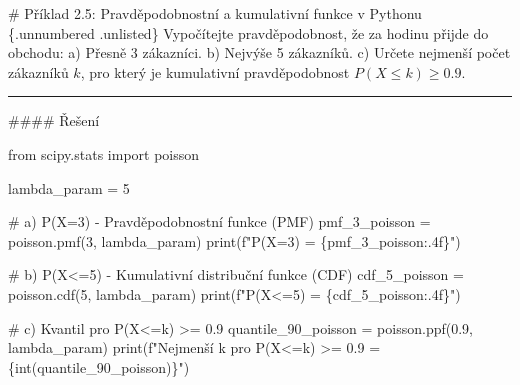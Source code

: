 \documentclass[
  czech,
  11pt,
  letterpaper,
  DIV=11,
  numbers=noendperiod]{scrreprt}
\newenvironment{Shaded}{\begin{snugshade}}{\end{snugshade}}
\newcommand{\BuiltInTok}[1]{\textcolor[rgb]{0.00,0.23,0.31}{#1}}
\newcommand{\CommentTok}[1]{\textcolor[rgb]{0.37,0.37,0.37}{#1}}
\newcommand{\DecValTok}[1]{\textcolor[rgb]{0.68,0.00,0.00}{#1}}
\newcommand{\FloatTok}[1]{\textcolor[rgb]{0.68,0.00,0.00}{#1}}
\newcommand{\ImportTok}[1]{\textcolor[rgb]{0.00,0.46,0.62}{#1}}
\newcommand{\NormalTok}[1]{\textcolor[rgb]{0.00,0.23,0.31}{#1}}
\newcommand{\OperatorTok}[1]{\textcolor[rgb]{0.37,0.37,0.37}{#1}}
\newcommand{\SpecialCharTok}[1]{\textcolor[rgb]{0.37,0.37,0.37}{#1}}
\newcommand{\SpecialStringTok}[1]{\textcolor[rgb]{0.13,0.47,0.30}{#1}}
\begin{document}
\begin{tcolorbox}[enhanced jigsaw, arc=.35mm, bottomrule=.15mm, bottomtitle=1mm, breakable, colback=white, colbacktitle=quarto-callout-note-color!10!white, colframe=quarto-callout-note-color-frame, coltitle=black, left=2mm, leftrule=.75mm, opacityback=0, opacitybacktitle=0.6, rightrule=.15mm, title=\textcolor{quarto-callout-note-color}{\faInfo}\hspace{0.5em}{Poznámka}, titlerule=0mm, toprule=.15mm, toptitle=1mm]

\# Příklad 2.5: Pravděpodobnostní a kumulativní funkce v Pythonu
\{.unnumbered .unlisted\} Vypočítejte pravděpodobnost, že za hodinu
přijde do obchodu: a) Přesně 3 zákazníci. b) Nejvýše 5 zákazníků. c)
Určete nejmenší počet zákazníků \(k\), pro který je kumulativní
pravděpodobnost \(P(X \le k) \ge 0.9\).

\begin{center}\rule{0.5\linewidth}{0.5pt}\end{center}

\#\#\#\# Řešení

\begin{Shaded}
\begin{Highlighting}[]
\ImportTok{from}\NormalTok{ scipy.stats }\ImportTok{import}\NormalTok{ poisson}

\NormalTok{lambda\_param }\OperatorTok{=} \DecValTok{5}

\CommentTok{\# a) P(X=3) {-} Pravděpodobnostní funkce (PMF)}
\NormalTok{pmf\_3\_poisson }\OperatorTok{=}\NormalTok{ poisson.pmf(}\DecValTok{3}\NormalTok{, lambda\_param)}
\BuiltInTok{print}\NormalTok{(}\SpecialStringTok{f"P(X=3) = }\SpecialCharTok{\{}\NormalTok{pmf\_3\_poisson}\SpecialCharTok{:.4f\}}\SpecialStringTok{"}\NormalTok{)}

\CommentTok{\# b) P(X\textless{}=5) {-} Kumulativní distribuční funkce (CDF)}
\NormalTok{cdf\_5\_poisson }\OperatorTok{=}\NormalTok{ poisson.cdf(}\DecValTok{5}\NormalTok{, lambda\_param)}
\BuiltInTok{print}\NormalTok{(}\SpecialStringTok{f"P(X\textless{}=5) = }\SpecialCharTok{\{}\NormalTok{cdf\_5\_poisson}\SpecialCharTok{:.4f\}}\SpecialStringTok{"}\NormalTok{)}

\CommentTok{\# c) Kvantil pro P(X\textless{}=k) \textgreater{}= 0.9}
\NormalTok{quantile\_90\_poisson }\OperatorTok{=}\NormalTok{ poisson.ppf(}\FloatTok{0.9}\NormalTok{, lambda\_param)}
\BuiltInTok{print}\NormalTok{(}\SpecialStringTok{f"Nejmenší k pro P(X\textless{}=k) \textgreater{}= 0.9 = }\SpecialCharTok{\{}\BuiltInTok{int}\NormalTok{(quantile\_90\_poisson)}\SpecialCharTok{\}}\SpecialStringTok{"}\NormalTok{)}
\end{Highlighting}
\end{Shaded}

\end{tcolorbox}
\end{document}
